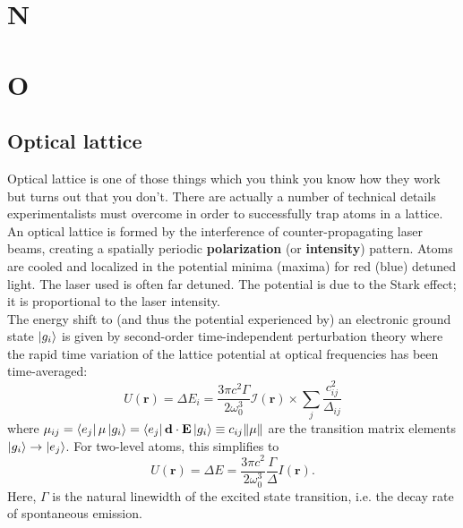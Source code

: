 \documentclass{book}
\theoremstyle{definition}
\newcommand{\I}{\mathcal{I}}
\newcommand{\f}[2]{\frac{#1}{#2}}
\begin{document}
\chapter*{N}
\chapter*{O}



\section*{Optical lattice}



Optical lattice is one of those things which you think you know how they work but turns out that you don't. There are actually a number of technical details experimentalists must overcome in order to successfully trap atoms in a lattice. \\




An optical lattice is formed by the interference of counter-propagating laser beams, creating a spatially periodic \textbf{polarization} (or \textbf{intensity}) pattern. Atoms are cooled and localized in the potential minima (maxima) for red (blue) detuned light. The laser used is often far detuned.  The potential is due to the Stark effect; it is proportional to the laser intensity. \\

The energy shift to (and thus the potential experienced by) an electronic ground state $\ket{g_i}$ is given by second-order time-independent perturbation theory where the rapid time variation of the lattice potential at optical frequencies has been time-averaged:
\begin{equation*}
U(\mathbf{r}) = \Delta E_i = \f{3\pi c^2 \Gamma}{2\omega_0^3}\I(\mathbf{r}) \times  \sum_j \f{c_{ij}^2}{\Delta_{ij}}
\end{equation*}
where $\mu_{ij} = \bra{e_j}\mu \ket{g_i}  = \bra{e_j} \mathbf{d}\cdot \mathbf{E} \ket{g_i} \equiv c_{ij}\norm{\mu}$ are the transition matrix elements $\ket{g_i} \to \ket{e_j}$. For two-level atoms, this simplifies to 
\begin{equation*}
U(\mathbf{r}) = \Delta E = \f{3\pi c^2}{2\omega_0^3}\f{\Gamma}{\Delta} I(\mathbf{r}).
\end{equation*}
Here, $\Gamma$ is the natural linewidth of the excited state transition, i.e. the decay rate of spontaneous emission. 
\end{document}
